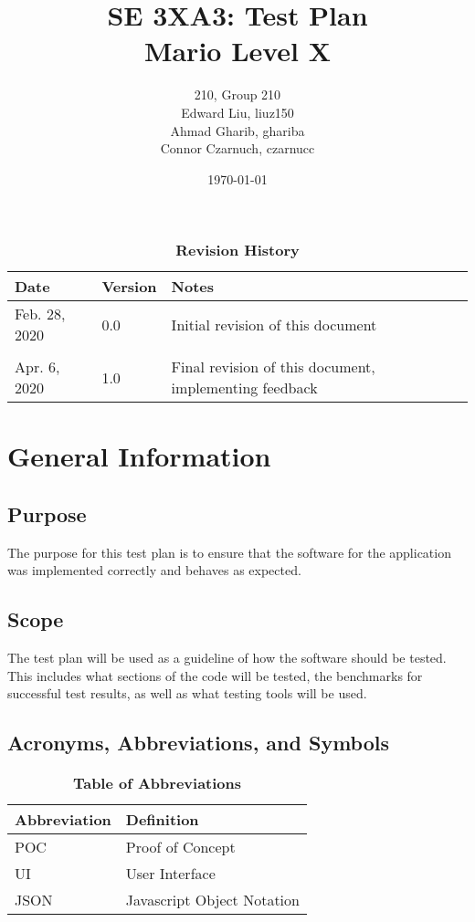 \documentclass[12pt, titlepage]{article}
\title{SE 3XA3: Test Plan\\Mario Level X}
\author{210, Group 210
		\\ Edward Liu, liuz150
		\\ Ahmad Gharib, ghariba
		\\ Connor Czarnuch, czarnucc
}
\date{\today}
\begin{document}
\maketitle

\tableofcontents
\listoftables
\listoffigures

\begin{table}[bp]
\caption{\bf Revision History}
\begin{tabularx}{\textwidth}{p{3cm}p{2cm}X}
\toprule {\bf Date} & {\bf Version} & {\bf Notes}\\
\midrule
Feb. 28, 2020 & 0.0 & Initial revision of this document\\
\bottomrule\\
\color{red}Apr. 6, 2020\color{black} & \color{red}1.0\color{black} & \color{red}Final revision of this document, implementing feedback\color{black}\\
\bottomrule
\end{tabularx}
\end{table}

\newpage


\section{General Information}

\subsection{Purpose}
The purpose for this test plan is to ensure that the software for the application was implemented correctly and behaves as expected.

\subsection{Scope}
The test plan will be used as a guideline of how the software should be tested. This includes what sections of the code will be tested, the benchmarks for successful test results, as well as what testing tools will be used.
\subsection{Acronyms, Abbreviations, and Symbols}

\begin{table}[hbp]
\caption{\textbf{Table of Abbreviations}} \label{Table}

\begin{tabularx}{\textwidth}{p{3cm}X}
\toprule
\textbf{Abbreviation} & \textbf{Definition} \\
\midrule
POC & Proof of Concept\\
UI & User Interface\\
JSON & Javascript Object Notation\\
\bottomrule
\end{tabularx}

\end{table}
\end{document}
